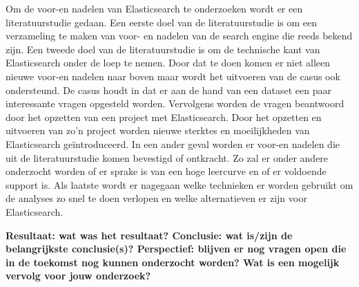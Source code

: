 Om de voor-en nadelen van Elasticsearch te onderzoeken wordt er een literatuurstudie gedaan. Een eerste doel van de literatuurstudie is om een verzameling te maken van voor- en nadelen van de search engine die reeds bekend zijn. Een tweede doel van de literatuurstudie is om de technische kant van Elasticsearch onder de loep te nemen. Door dat te doen komen er niet alleen nieuwe voor-en nadelen naar boven maar wordt het uitvoeren van de casus ook ondersteund. De casus houdt in dat er aan de hand van een dataset een paar interessante vragen
opgesteld worden. Vervolgens worden de vragen beantwoord door het opzetten van een project met Elasticsearch.
Door het opzetten en uitvoeren van zo'n project worden nieuwe sterktes en moeilijkheden van Elasticsearch geïntroduceerd. In een ander geval worden er voor-en nadelen die uit de literatuurstudie komen bevestigd of ontkracht. Zo zal er onder andere onderzocht worden of er sprake is van een hoge leercurve en of er voldoende support is. Als laatste wordt er nagegaan welke technieken er worden gebruikt om de analyses zo snel te doen verlopen en welke alternatieven er zijn voor Elasticsearch.

\textbf{Resultaat: wat was het resultaat?
Conclusie: wat is/zijn de belangrijkste conclusie(s)?
Perspectief: blijven er nog vragen open die in de toekomst nog kunnen
onderzocht worden? Wat is een mogelijk vervolg voor jouw onderzoek?}

